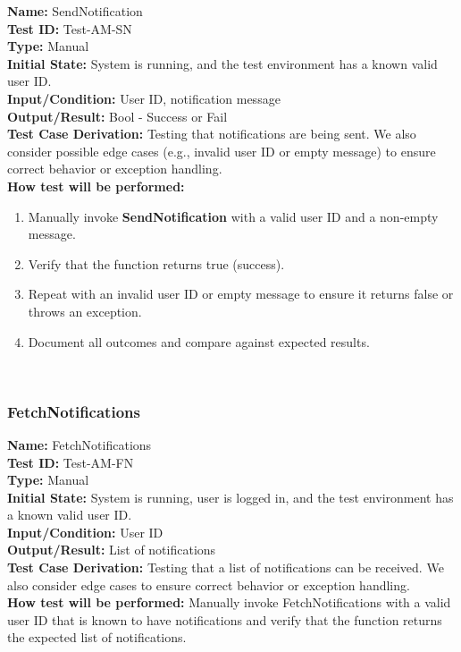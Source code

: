 \documentclass[12pt, titlepage]{article}
\begin{document}
\textbf{Name:} SendNotification \label{itm:Test-AM-SN} \\
\textbf{Test ID:} Test-AM-SN \\
\textbf{Type:} Manual \\
\textbf{Initial State:} System is running, and the test environment has a known valid user ID. \\
\textbf{Input/Condition:} User ID, notification message \\
\textbf{Output/Result:}  Bool - Success or Fail \\
\textbf{Test Case Derivation:} Testing that notifications are being sent. We also consider possible edge cases (e.g., invalid user ID or empty message) to ensure correct behavior or exception handling.\\
\textbf{How test will be performed:}
\begin{enumerate}
    \item Manually invoke \textbf{SendNotification} with a valid user ID and a non-empty message.
    \item Verify that the function returns true (success).
    \item Repeat with an invalid user ID or empty message to ensure it returns false or throws an exception. 
    \item Document all outcomes and compare against expected results.
\end{enumerate}\\

\subsubsection{FetchNotifications}
\noindent
\textbf{Name:} FetchNotifications \label{itm:Test-AM-FN} \\
\textbf{Test ID:} Test-AM-FN \\
\textbf{Type:} Manual \\
\textbf{Initial State:} System is running, user is logged in, and the test environment has a known valid user ID. \\
\textbf{Input/Condition:} User ID \\
\textbf{Output/Result:} List of notifications \\
\textbf{Test Case Derivation:} Testing that a list of notifications can be received. We also consider edge cases to ensure correct behavior or exception handling.\\
\textbf{How test will be performed:} Manually invoke FetchNotifications with a valid user ID that is known to have notifications and verify that the function returns the expected list of notifications.
\end{document}
